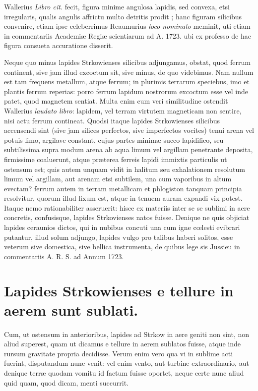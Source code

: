 \documentclass[a4paper, 11pt, oneside, polutonikogreek, latin]{article}
\begin{document}
Wallerius \emph{Libro cit.} fecit, figura minime angulosa lapidis, sed convexa, etsi irregularis, qualis angulis affrictu multo detritis prodit ; hanc figuram silicibus convenire, etiam ipse celeberrimus Reaumurius \emph{loco nominato} meminit, uti etiam in commentariis Academiæ Regiæ scientiarum ad A. 1723. ubi ex professo de hac figura consueta accuratione disserit.

Neque quo minus lapides Strkowienses silicibus adjungamus, obstat, quod ferrum continent, sive jam illud excoctum sit, sive minus, de quo videbimus. Nam nullum est tam frequens metallum, atque ferrum; in plurimis terrarum speciebus, imo et plantis ferrum reperias: porro ferrum lapidum nostrorum excoctum esse vel inde patet, quod magnetem sentiat.  Multa enim cum veri similitudine ostendit Wallerius \emph{laudato libro}: lapidem, vel terram virtutem magneticam non sentire, nisi actu ferrum contineat. Quodsi itaque lapides Strkowienses silicibus accensendi sint (sive jam silices perfectos, sive imperfectos vocites) tenui arena vel potuis limo, argilave constant, cujus partes minimæ succo lapidifico, seu subtilissima supra modum arena ab aqua limum vel argillam penetrante deposita, firmissime coaluerunt, atque præterea ferreis lapidi immixtis particulis ut ostensum est; quis autem unquam vidit in halitum seu exhalationem resolutum limum vel argillam, aut arenam etsi subtilem, una cum vaporibus in altum evectam? ferrum autem in terram metallicam et phlogiston tanquam principia resolvitur, quorum illud fixum est, atque in tenuem auram expandi vix potest. Itaque nemo rationabiliter asseruerit: hisce ex materiis inter se se sublimi in aere concretis, confusisque, lapides Strkovienses natos fuisse. Denique ne quis objiciat lapides ceraunios dictos, qui in nubibus concuti una cum igne cœlesti evibrari putantur, illud solum adjungo, lapides vulgo pro talibus haberi solitos, esse veterum sive domestica, sive bellica instrumenta, de quibus lege sis Jussieu in commentariis A. R. S. ad Annum 1723.
\clearpage
\section[Lapides Strkowienses e tellure in aerem sunt sublati.]{\bfseries{Lapides Strkowienses e tellure in aerem sunt sublati.}}
\paragraph{}
Cum, ut ostensum in anterioribus, lapides ad Strkow in aere geniti non sint, non aliud superest, quam ut dicamus e tellure in aerem sublatos fuisse, atque inde rursum gravitate propria decidisse. Verum enim vero qua vi in sublime acti fuerint, disputandum nunc venit: vel enim vento, aut turbine extraordinario, aut denique terræ quodam vomitu id factum fuisse oportet, neque certe nunc aliud quid quam, quod dicam, menti succurrit.
\clearpage
\end{document}
